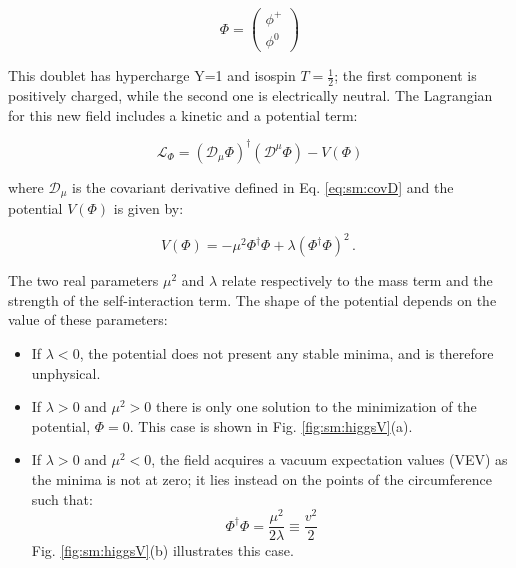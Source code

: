 \begin{equation}
	\Phi = \left( \begin{array}{c} \phi^+  \\ \phi^0 \end{array} \right)
\end{equation}

This doublet has hypercharge Y=1 and isospin $T=\frac{1}{2}$; the first component is positively charged, while the second one is electrically neutral. The Lagrangian for this new field includes a kinetic and a potential term:

\begin{equation}
	\mathcal{L}_{\Phi} = ( \mathcal{D}_{\mu} \Phi)^{\dagger} (\mathcal{D}^{\mu} \Phi) - V(\Phi) 
	\label{eq:Lhiggs}
\end{equation}

\noindent where $\mathcal{D}_{\mu}$ is the covariant derivative defined in Eq. \ref{eq:sm:covD} and the potential $V(\Phi)$ is given by:

\begin{equation}
 V(\Phi) = - \mu^2 \Phi^{\dagger} \Phi + \lambda (\Phi^{\dagger} \Phi)^2 \, . \
	\label{eq:hpot}
\end{equation}

\noindent The two real parameters $\mu^2$ and $\lambda$ relate respectively to the mass term and the strength of the self-interaction term. The shape of the potential depends on the value of these parameters:
\begin{itemize}
\item If $\lambda < 0$, the potential does not present any stable minima, and is therefore unphysical.
\item If $\lambda > 0$ and $\mu^2 > 0$ there is only one solution to the minimization of the potential, $\Phi=0$. This case is shown in Fig. \ref{fig:sm:higgsV}(a).
\item If $\lambda > 0$ and $\mu^2 < 0$, the field acquires a vacuum expectation values (VEV) as the minima is not at zero; it lies instead on the points of the circumference such that:
\begin{equation}
\Phi^{\dagger} \Phi = \frac{\mu^2}{2 \lambda}  \equiv \frac{v^2}{2}
\end{equation}
\noindent Fig. \ref{fig:sm:higgsV}(b) illustrates this case.
\end{itemize}


